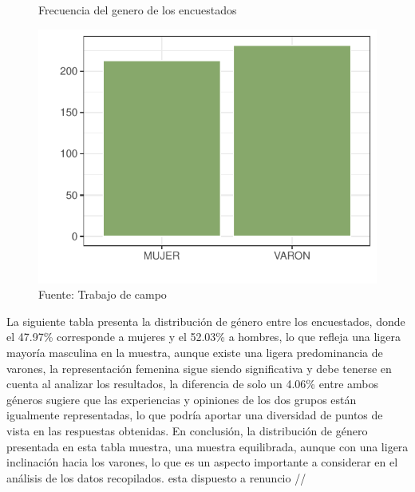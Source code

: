 \documentclass{article}\usepackage[]{graphicx}\usepackage[table]{xcolor}
\makeatletter
\def\maxwidth{ %
  \ifdim\Gin@nat@width>\linewidth
    \linewidth
  \else
    \Gin@nat@width
  \fi
}
\newenvironment{knitrout}{}{} %
\makeatother
\begin{document}
\begin{figure}[H]
  \centering
  \caption{Frecuencia del genero de los encuestados}
\begin{knitrout}
\color{fgcolor}
\includegraphics[width=\maxwidth]{figure/fig_dos-1} 
\end{knitrout}
  \caption*{Fuente: Trabajo de campo}
\end{figure}
La siguiente tabla  presenta la distribución de género entre los encuestados, donde el 47.97\% corresponde a mujeres y el 52.03\% a hombres, lo que refleja una ligera mayoría masculina en la muestra, aunque existe una ligera predominancia de varones, la representación femenina sigue siendo significativa y debe tenerse en cuenta al analizar los resultados, la diferencia de solo un 4.06\% entre ambos géneros sugiere que las experiencias y opiniones de los dos grupos están igualmente representadas, lo que podría aportar una diversidad de puntos de vista en las respuestas obtenidas. En conclusión, la distribución de género presentada en esta tabla muestra, una muestra equilibrada, aunque con una ligera inclinación hacia los varones, lo que es un aspecto importante a considerar en el análisis de los datos recopilados.
esta dispuesto a renuncio //
\end{document}
